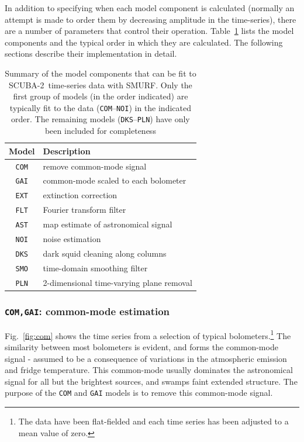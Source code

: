 \documentclass[useAMS,usenatbib,nofootinbib]{mn2e}
\newcommand{\scuba}{SCUBA-2}
\newcommand{\model}[1]{\texttt{#1}}
\begin{document}
In addition to specifying when each model component is calculated
(normally an attempt is made to order them by decreasing amplitude in
the time-series), there are a number of parameters that control their
operation. Table~\ref{tab:components} lists the model components and
the typical order in which they are calculated. The following sections
describe their implementation in detail.

\begin{table}
  \caption{Summary of the model components that can be fit to
    \scuba\ time-series data with SMURF. Only the first group of
    models (in the order indicated) are typically fit to the data
    (\model{COM}--\model{NOI}) in the indicated order. The remaining
    models (\model{DKS}--\model{PLN}) have only been included for
    completeness}
  \vspace{0.2cm}
  \centering
  \begin{tabular}{c|l}
    \hline
    Model & Description \\
    \hline
    \model{COM} & remove common-mode signal \\
    \model{GAI} & common-mode scaled to each bolometer \\
    \model{EXT} & extinction correction \\
    \model{FLT} & Fourier transform filter \\
    \model{AST} & map estimate of astronomical signal \\
    \model{NOI} & noise estimation \\
    \hline
    \model{DKS} & dark squid cleaning along columns \\
    \model{SMO} & time-domain smoothing filter \\
    \model{PLN} & 2-dimensional time-varying plane removal \\
    \hline
    \end{tabular}
  \label{tab:components}
\end{table}

\subsubsection{\model{COM,GAI}: common-mode estimation}
\label{sec:comgai}

﻿Fig.~\ref{fig:com} shows the time series from a selection of typical
bolometers.\footnote{The data have been flat-fielded and each time series
has been adjusted to a mean value of zero.} The similarity between most
bolometers is evident, and forms the common-mode signal - assumed to be a
consequence of variations in the atmospheric emission and fridge
temperature. This common-mode usually dominates the astronomical signal
for all but the brightest sources, and swamps faint extended structure.
The purpose of the \model{COM} and \model{GAI} models is to remove this common-mode
signal.
\end{document}
